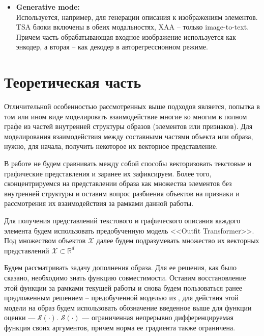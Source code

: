 \documentclass[a4paper,12pt]{article}
\begin{document}
\begin{itemize}
					\item[]\textbf{Generative mode:}\\
					Используется, например, для генерации описания к изображениям элементов. TSA блоки включены в обеих модальностях, XAA -- только image-to-text. Причем часть обрабатывающая входное изображение используется как энкодер, а вторая -- как декодер в авторегрессионном режиме.
				\end{itemize}
			
		\section{Теоретическая часть}
				Отличительной особенностью рассмотренных выше подходов является, попытка в том или ином виде моделировать взаимодействие многие ко многим в полном графе из частей внутренней структуры образов (элементов или признаков). Для моделирования взаимодействия между составными частями объекта или образа, нужно, для начала, получить некоторое их векторное представление. 
				
				В работе не будем сравнивать между собой способы векторизовать текстовые и графические представления и заранее их зафиксируем. Более того, сконцентрируемся на представлении образа как множества элементов без внутренней структуры и оставим вопрос разбиения объектов на признаки и рассмотрения их взаимодействия за рамками данной работы.
								
				Для получения представлений текстового и графического описания каждого элемента будем использовать предобученную модель <<Outfit Transformer>>\cite{https://doi.org/10.48550/arXiv.2204.04812}. Под множеством объектов $\mathcal{X}$ далее будем подразумевать множество их векторных представлений $\mathcal{X}\subset \mathbb{R}^d$
				
				Будем рассматривать задачу дополнения образа. Для ее решения, как было сказано, необходимо знать функцию совместимости. Оставим восстановление этой функции за рамками текущей работы и снова будем пользоваться ранее предложенным решением -- предобученной моделью из \cite{https://doi.org/10.48550/arXiv.2204.04812}, для действия этой модели на образ будем использовать обозначение введенное выше для функции оценки --- $\mathcal{S}(\cdot)$. 
				$\mathcal{S}(\cdot)$ --- ограниченная непрерывно дифференцируемая функция своих аргументов, причем норма ее градиента также ограничена. 
				
\end{document}
